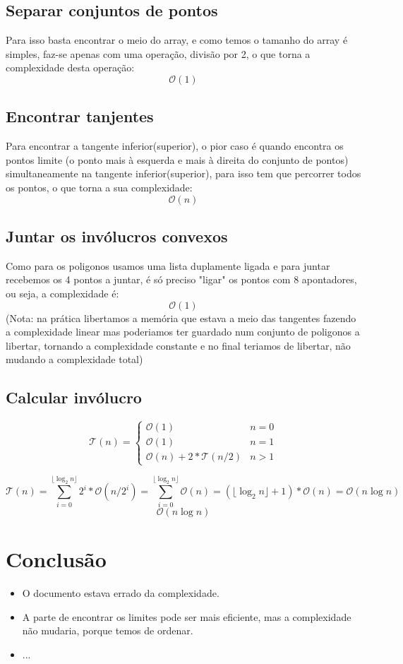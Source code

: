 \documentclass[11pt]{article}
\begin{document}
\subsection{Separar conjuntos de pontos}
Para isso basta encontrar o meio do array,
e como temos o tamanho do array é simples, faz-se apenas com uma operação,
divisão por 2, o que torna a complexidade desta operação:
$$\mathcal{O}(1)$$

\subsection{Encontrar tanjentes}
Para encontrar a tangente inferior(superior),
o pior caso é quando encontra os pontos limite
(o ponto mais à esquerda e mais à direita do conjunto de pontos) 
simultaneamente na tangente inferior(superior), 
para isso tem que percorrer todos os pontos,
o que torna a sua complexidade: 
$$\mathcal{O}(n)$$

\subsection{Juntar os invólucros convexos}
Como para os poligonos usamos uma lista duplamente ligada e
para juntar recebemos os 4 pontos a juntar, é só preciso 
"ligar" os pontos com 8 apontadores, ou seja, a complexidade é: 
$$\mathcal{O}(1)$$
(Nota: na prática libertamos a memória que estava 
a meio das tangentes fazendo a complexidade linear
mas poderiamos ter guardado num conjunto de poligonos 
a libertar, tornando a complexidade constante e no final 
teriamos de libertar, não mudando a complexidade total)

\subsection{Calcular invólucro}
$$
    \mathcal{T}(n) = 
        \begin{cases}
            \mathcal{O}(1)                      & n = 0\\
            \mathcal{O}(1)                      & n = 1\\
            \mathcal{O}(n) + 2*\mathcal{T}(n/2) & n > 1
        \end{cases}
$$

$$
    \mathcal{T}(n) = \sum_{i=0}^{\lfloor\log_{2}n\rfloor} 2^i*\mathcal{O}(n/2^i)
    = \sum_{i=0}^{\lfloor\log_{2}n\rfloor} \mathcal{O}(n)
    = (\lfloor\log_{2}n\rfloor + 1)*\mathcal{O}(n)
    = \mathcal{O}(n\log{n})
$$
$$
    \mathcal{O}(n\log{n})
$$


\section{Conclusão}
\begin{itemize}
    \item O documento estava errado da complexidade.
    \item A parte de encontrar os limites pode ser mais eficiente, 
        mas a complexidade não mudaria, porque temos de ordenar.
    \item ...
\end{itemize}
\end{document}
